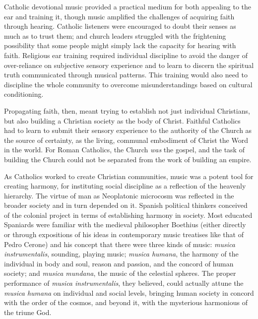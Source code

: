 Catholic devotional music provided a practical medium for both appealing to the
ear and training it, though music amplified the challenges of acquiring faith
through hearing.
Catholic listeners were encouraged to doubt their senses as much as to trust
them; and church leaders struggled with the frightening possibility that some
people might simply lack the capacity for hearing with faith.
Religious ear training required individual discipline to avoid the danger of
over-reliance on subjective sensory experience and to learn to discern the
spiritual truth communicated through musical patterns.
This training would also need to discipline the whole community to overcome
misunderstandings based on cultural conditioning.

Propagating faith, then, meant trying to establish not just individual
Christians, but also building a Christian society as the body of Christ.
Faithful Catholics had to learn to submit their sensory experience to the
authority of the Church as the source of certainty, as the living, communal
embodiment of Christ the Word in the world.
For Roman Catholics, the Church \emph{was} the gospel, and the task of building
the Church could not be separated from the work of building an empire.

As Catholics worked to create Christian communities, music was a potent tool for
creating harmony, for instituting social discipline as a reflection of the
heavenly hierarchy.%
    \Autocites{Baker:Harmony}{Irving:Colonial}{Illari:Polychoral}
The virtue of man as Neoplatonic microcosm was reflected in the broader society
and in turn depended on it.
Spanish political thinkers conceived of the colonial project in terms of
establishing harmony in society.%
    \Autocite[22--31]{Baker:Harmony}
Most educated Spaniards were familiar with the medieval philosopher Boethius
(either directly or through expositions of his ideas in contemporary music
treatises like that of Pedro Cerone) and his concept that there were three kinds
of music: \emph{musica instrumentalis}, sounding, playing music; \emph{musica
humana}, the harmony of the individual in body and soul, reason and passion, and
the concord of human society; and \emph{musica mundana}, the music of the
celestial spheres.%
    \Autocites
    [, ]{Cerone:Melopeo}
    [203--208]{Boethius:Musica}
The proper performance of \emph{musica instrumentalis}, they believed, could
actually attune the \emph{musica humana} on individual and social levels,
bringing human society in concord with the order of the cosmos, and beyond it,
with the mysterious harmonious of the triune God.

